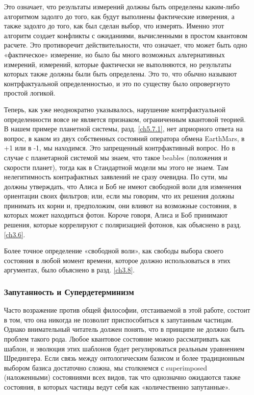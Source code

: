 \documentclass[main.tex]{subfiles}
\begin{document}
Это означает, что результаты измерений должны быть определены каким-либо алгоритмом задолго до того, как будут выполнены фактические измерения, а также задолго до того, как был сделан выбор, что измерять. Именно этот алгоритм создает конфликты с ожиданиями, вычисленными в простом квантовом расчете. Это противоречит действительности, что означает, что может быть одно «фактическое» измерение, но было бы много возможных альтернативных измерений, измерений, которые фактически не выполняются, но результаты которых также должны были быть определены. Это то, что обычно называют контрфактуальной определенностью, и это по существу было опровергнуто простой логикой.

Теперь, как уже неоднократно указывалось, нарушение контрфактуальной определенности вовсе не является признаком, ограниченным квантовой теорией. В нашем примере планетной системы, разд. \ref{ch5.7.1}, нет априорного ответа на вопрос, в каком из двух собственных состояний оператора обмена EarthMars, в +1 или в -1, мы находимся. Это запрещенный контрфактивный вопрос. Но в случае с планетарной системой мы знаем, что такое beables (положения и скорости планет), тогда как в Стандартной модели мы этого не знаем. Там нелегитимность контрафактных заявлений не сразу очевидна. По сути, мы должны утверждать, что Алиса и Боб не имеют свободной воли для изменения ориентации своих фильтров; или, если мы говорим, что их решения должны принимать их корни и, предположим, они влияют на возможные состояния, в которых может находиться фотон. Короче говоря, Алиса и Боб принимают решения, которые коррелируют с поляризацией фотонов, как объяснено в разд. \ref{ch3.6}.

Более точное определение «свободной воли», как свободы выбора своего состояния в любой момент времени, которое должно использоваться в этих аргументах, было объяснено в разд. \ref{ch3.8}.

\subsubsection{Запутанность и Супердетерминизм}\label{ch5.7.3}

Часто возражение против общей философии, отстаиваемой в этой работе, состоит в том, что она никогда не позволит приспособиться к запутанным частицам. Однако внимательный читатель должен понять, что в принципе не должно быть проблем такого рода. Любое квантовое состояние можно рассматривать как шаблон, и эволюция этих шаблонов будет регулироваться реальным уравнением Шредингера. Если связь между онтологическим базисом и более традиционным выбором базиса достаточно сложна, мы столкнемся с superimposed (наложенными) состояниями всех видов, так что однозначно ожидаются также состояния, в которых частицы ведут себя как «количественно запутанные».
\end{document}
